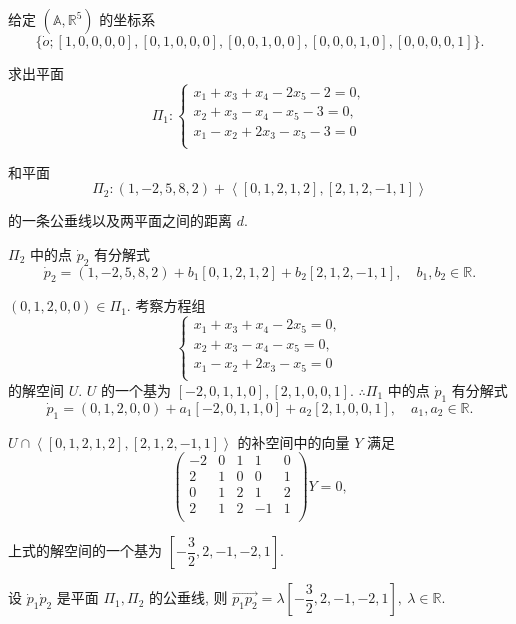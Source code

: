 \documentclass[color=black,device=normal,lang=cn,mode=geye]{elegantnote}
\begin{document}
\begin{exercise}%
    给定 $(\mathbb{A},\mathbb{R}^5)$ 的坐标系
    \[\{\dot{o};[1,0,0,0,0],[0,1,0,0,0],[0,0,1,0,0],[0,0,0,1,0],[0,0,0,0,1]\}.\]
    
    求出平面
    \[\varPi_1:\begin{cases}
        x_1+x_3+x_4-2x_5-2=0, \\
        x_2+x_3-x_4-x_5-3=0, \\
        x_1-x_2+2x_3-x_5-3=0 \\
    \end{cases}\]

    和平面
    \[\varPi_2:(1,-2,5,8,2)+\left<[0,1,2,1,2],[2,1,2,-1,1]\right>\]

    的一条公垂线以及两平面之间的距离 $d$.
\end{exercise}
\begin{solution}
    $\varPi_2$ 中的点 $\dot{p}_2$ 有分解式
    \[\dot{p}_2=(1,-2,5,8,2)+b_1[0,1,2,1,2]+b_2[2,1,2,-1,1],\quad b_1,b_2\in\mathbb{R}.\]

    $(0,1,2,0,0)\in\varPi_1$. 考察方程组
    \[\begin{cases}
        x_1+x_3+x_4-2x_5=0, \\
        x_2+x_3-x_4-x_5=0, \\
        x_1-x_2+2x_3-x_5=0 \\
    \end{cases}\]
    的解空间 $U$. $U$ 的一个基为 $[-2,0,1,1,0],[2,1,0,0,1]$. $\therefore\varPi_1$ 中的点 $\dot{p}_1$ 有分解式
    \[\dot{p}_1=(0,1,2,0,0)+a_1[-2,0,1,1,0]+a_2[2,1,0,0,1],\quad a_1,a_2\in\mathbb{R}.\]

    $U\cap\left<[0,1,2,1,2],[2,1,2,-1,1]\right>$ 的补空间中的向量 $Y$ 满足
    \[\begin{pmatrix}
        -2 & 0 & 1 & 1 & 0 \\
        2 & 1 & 0 & 0 & 1 \\
        0 & 1 & 2 & 1 & 2 \\
        2 & 1 & 2 & -1 & 1 \\
    \end{pmatrix}Y=0,\]

    上式的解空间的一个基为 $\left[-\dfrac{3}{2},2,-1,-2,1\right]$.

    设 $\dot{p}_1\dot{p}_2$ 是平面 $\varPi_1,\varPi_2$ 的公垂线, 则 $\overrightarrow{p_1p_2}=\lambda\left[-\dfrac{3}{2},2,-1,-2,1\right],\ \lambda\in\mathbb{R}$.


\end{solution}
\end{document}

